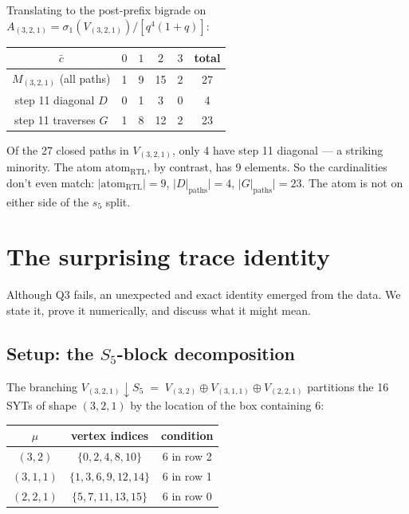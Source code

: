 \documentclass[11pt]{article}
\theoremstyle{definition}
\begin{document}
Translating to the post-prefix bigrade on $A_{(3,2,1)} = \sigma_1(V_{(3,2,1)}) / [q^4(1+q)]$:

\begin{center}
\begin{tabular}{c|cccc|c}
$\bar c$ & $0$ & $1$ & $2$ & $3$ & total\\\hline
$M_{(3,2,1)}$ (all paths) & 1 & 9 & 15 & 2 & 27\\
step 11 diagonal $D$ & 0 & 1 & 3 & 0 & 4\\
step 11 traverses $G$ & 1 & 8 & 12 & 2 & 23\\
\end{tabular}
\end{center}

Of the 27 closed paths in $V_{(3,2,1)}$, only 4 have step 11 diagonal --- a striking minority. The atom $\mathrm{atom}_{\mathrm{RTL}}$, by contrast, has 9 elements. So the cardinalities don't even match: $|\mathrm{atom}_{\mathrm{RTL}}| = 9$, $|D|_{\text{paths}}|=4$, $|G|_{\text{paths}}|=23$. The atom is not on either side of the $s_5$ split.

\section{The surprising trace identity}\label{sec:surprise}

Although Q3 fails, an unexpected and exact identity emerged from the data. We state it, prove it numerically, and discuss what it might mean.

\subsection*{Setup: the $S_5$-block decomposition}

The branching $V_{(3,2,1)} \downarrow S_5 \;=\; V_{(3,2)} \oplus V_{(3,1,1)} \oplus V_{(2,2,1)}$ partitions the 16 SYTs of shape $(3,2,1)$ by the location of the box containing $6$:
\begin{center}
\begin{tabular}{c|c|c}
$\mu$ & vertex indices & condition\\\hline
$(3,2)$    & $\{0, 2, 4, 8, 10\}$ & $6$ in row 2\\
$(3,1,1)$  & $\{1, 3, 6, 9, 12, 14\}$ & $6$ in row 1\\
$(2,2,1)$  & $\{5, 7, 11, 13, 15\}$ & $6$ in row 0\\
\end{tabular}
\end{center}
\end{document}
